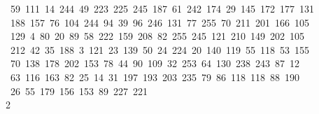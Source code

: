 \begin{tabbing}
\ 59\ 111\ 14\ 244\ 49\ 223\ 225\ 245\ 187\ 61\ 242\ 174\ 29\ 145\ 172\ 177\ 131\\[0pt]
\>\ 188\ 157\ 76\ 104\ 244\ 94\ 39\ 96\ 246\ 131\ 77\ 255\ 70\ 211\ 201\ 166\ 105\ \\[0pt]
\ 129\ 4\ 80\ 20\ 89\ 58\ 222\ 159\ 208\ 82\ 255\ 245\ 121\ 210\ 149\ 202\ 105\\[0pt]
\>\ 212\ 42\ 35\ 188\ 3\ 121\ 23\ 139\ 50\ 24\ 224\ 20\ 140\ 119\ 55\ 118\ 53\ 155\ \\[0pt]
\ 70\ 138\ 178\ 202\ 153\ 78\ 44\ 90\ 109\ 32\ 253\ 64\ 130\ 238\ 243\ 87\ 12\ \\[0pt]
\ 63\ 116\ 163\ 82\ 25\ 14\ 31\ 197\ 193\ 203\ 235\ 79\ 86\ 118\ 118\ 88\ 190\\[0pt]
\>\ 26\ 55\ 179\ 156\ 153\ 89\ 227\ 221\\[0pt]
2\>\end{tabbing}
